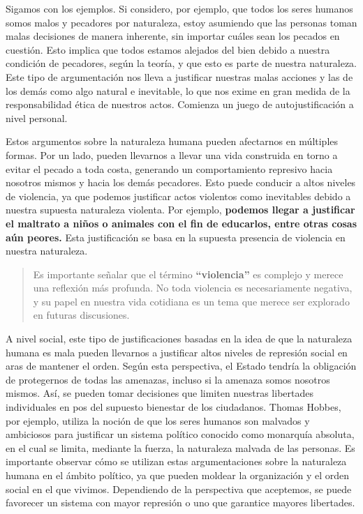 \documentclass[
  a4paper,
]{article}
\begin{document}
Sigamos con los ejemplos. Si considero, por ejemplo, que todos los seres
humanos somos malos y pecadores por naturaleza, estoy asumiendo que las
personas toman malas decisiones de manera inherente, sin importar cuáles
sean los pecados en cuestión. Esto implica que todos estamos alejados
del bien debido a nuestra condición de pecadores, según la teoría, y que
esto es parte de nuestra naturaleza. Este tipo de argumentación nos
lleva a justificar nuestras malas acciones y las de los demás como algo
natural e inevitable, lo que nos exime en gran medida de la
responsabilidad ética de nuestros actos. Comienza un juego de
autojustificación a nivel personal.

Estos argumentos sobre la naturaleza humana pueden afectarnos en
múltiples formas. Por un lado, pueden llevarnos a llevar una vida
construida en torno a evitar el pecado a toda costa, generando un
comportamiento represivo hacia nosotros mismos y hacia los demás
pecadores. Esto puede conducir a altos niveles de violencia, ya que
podemos justificar actos violentos como inevitables debido a nuestra
supuesta naturaleza violenta. Por ejemplo, \textbf{podemos llegar a
justificar el maltrato a niños o animales con el fin de educarlos, entre
otras cosas aún peores.} Esta justificación se basa en la supuesta
presencia de violencia en nuestra naturaleza.

\begin{quote}
Es importante señalar que el término \textbf{``violencia''} es complejo
y merece una reflexión más profunda. No toda violencia es necesariamente
negativa, y su papel en nuestra vida cotidiana es un tema que merece ser
explorado en futuras discusiones.
\end{quote}

A nivel social, este tipo de justificaciones basadas en la idea de que
la naturaleza humana es mala pueden llevarnos a justificar altos niveles
de represión social en aras de mantener el orden. Según esta
perspectiva, el Estado tendría la obligación de protegernos de todas las
amenazas, incluso si la amenaza somos nosotros mismos. Así, se pueden
tomar decisiones que limiten nuestras libertades individuales en pos del
supuesto bienestar de los ciudadanos. Thomas Hobbes, por ejemplo,
utiliza la noción de que los seres humanos son malvados y ambiciosos
para justificar un sistema político conocido como monarquía absoluta, en
el cual se limita, mediante la fuerza, la naturaleza malvada de las
personas. Es importante observar cómo se utilizan estas argumentaciones
sobre la naturaleza humana en el ámbito político, ya que pueden moldear
la organización y el orden social en el que vivimos. Dependiendo de la
perspectiva que aceptemos, se puede favorecer un sistema con mayor
represión o uno que garantice mayores libertades.
\end{document}
